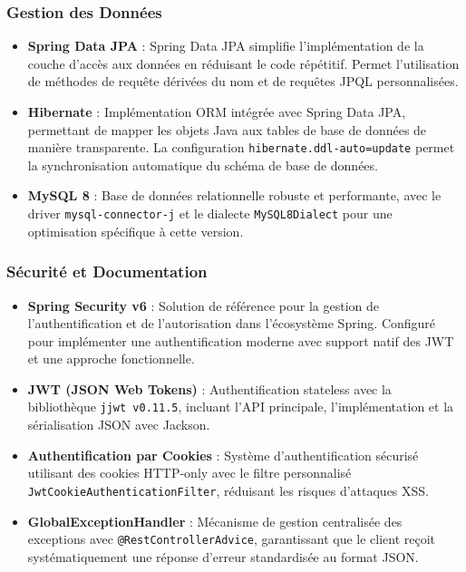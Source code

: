 \subsubsection{Gestion des Données}

\begin{itemize}
    \item \textbf{Spring Data JPA} : Spring Data JPA simplifie l'implémentation de la couche d'accès aux données en réduisant le code répétitif. Permet l'utilisation de méthodes de requête dérivées du nom et de requêtes JPQL personnalisées.

    \item \textbf{Hibernate} : Implémentation ORM intégrée avec Spring Data JPA, permettant de mapper les objets Java aux tables de base de données de manière transparente. La configuration \texttt{hibernate.ddl-auto=update} permet la synchronisation automatique du schéma de base de données.

    \item \textbf{MySQL 8} : Base de données relationnelle robuste et performante, avec le driver \texttt{mysql-connector-j} et le dialecte \texttt{MySQL8Dialect} pour une optimisation spécifique à cette version.
\end{itemize}

\subsubsection{Sécurité et Documentation}

\begin{itemize}
    \item \textbf{Spring Security v6} : Solution de référence pour la gestion de l'authentification et de l'autorisation dans l'écosystème Spring. Configuré pour implémenter une authentification moderne avec support natif des JWT et une approche fonctionnelle.

    \item \textbf{JWT (JSON Web Tokens)} : Authentification stateless avec la bibliothèque \texttt{jjwt v0.11.5}, incluant l'API principale, l'implémentation et la sérialisation JSON avec Jackson.

    \item \textbf{Authentification par Cookies} : Système d'authentification sécurisé utilisant des cookies HTTP-only avec le filtre personnalisé \texttt{JwtCookieAuthenticationFilter}, réduisant les risques d'attaques XSS.

    \item \textbf{GlobalExceptionHandler} : Mécanisme de gestion centralisée des exceptions avec \texttt{@RestControllerAdvice}, garantissant que le client reçoit systématiquement une réponse d'erreur standardisée au format JSON.
\end{itemize}

